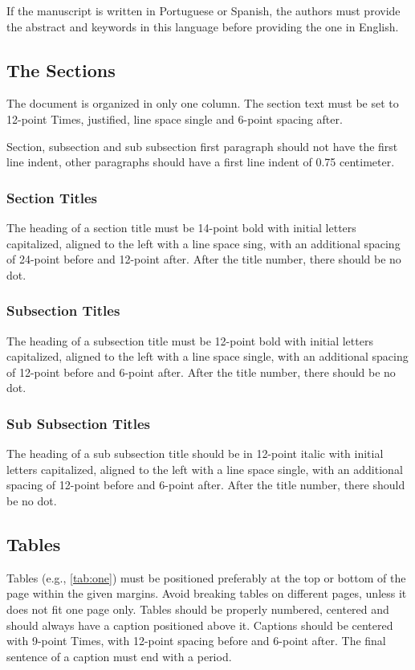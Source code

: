 \documentclass[english, spanish, brazilian]{RBIEarticle} %
\begin{document}
If the manuscript is written in Portuguese or Spanish, the authors must provide the abstract and keywords in this language before providing the one in English.


\subsection{The Sections}
The document is organized in only one column. The section text must be set to 12-point Times, justified, line space single and 6-point spacing after.

Section, subsection and sub subsection first paragraph should not have the first line indent, other paragraphs should have a first line indent of 0.75 centimeter.


\subsubsection{Section Titles}
The heading of a section title must be 14-point bold with initial letters capitalized, aligned to the left with a line space sing, with an additional spacing of 24-point before and 12-point after. After the title number, there should be no dot.


\subsubsection{Subsection Titles}
The heading of a subsection title must be 12-point bold with initial letters capitalized, aligned to the left with a line space single, with an additional spacing of 12-point before and 6-point after. After the title number, there should be no dot.


\subsubsection{Sub Subsection Titles}
The heading of a sub subsection title should be in 12-point italic with initial letters capitalized, aligned to the left with a line space single, with an additional spacing of 12-point before and 6-point after. After the title number, there should be no dot.


\subsection{Tables}
Tables (e.g., \autoref{tab:one}) must be positioned preferably at the top or bottom of the page within the given margins. Avoid breaking tables on different pages, unless it does not fit one page only. Tables should be properly numbered, centered and should always have a caption positioned above it. Captions should be centered with 9-point Times, with 12-point spacing before and 6-point after. The final sentence of a caption must end with a period.
\end{document}
